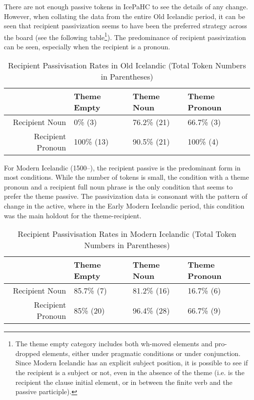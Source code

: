 There are not enough passive tokens in IcePaHC to see the details of any change. However, when collating the data from the entire Old Icelandic period, it can be seen that recipient passivization seems to have been the preferred strategy across the board (see the following table\footnote{The theme empty category includes both wh-moved elements and pro-dropped elements, either under pragmatic conditions or under conjunction. Since Modern Icelandic has an explicit subject position, it is possible to see if the recipient is a subject or not, even in the absence of the theme (i.e. is the recipient the clause initial element, or in between the finite verb and the passive participle).}). The predominance of recipient passivization can be seen, especially when the recipient is a pronoun.

\begin{table}[ht]
\centering
\begin{tabular}{rlll}
  \hline
 & Theme Empty & Theme Noun & Theme Pronoun \\ 
  \hline
Recipient Noun & 0\% (3) & 76.2\% (21) & 66.7\% (3) \\ 
  Recipient Pronoun & 100\% (13) & 90.5\% (21) & 100\% (4) \\ 
   \hline
\end{tabular}
\caption{Recipient Passivisation Rates in Old Icelandic (Total Token Numbers in Parentheses)} 
\end{table}



For Modern Icelandic (1500--), the recipient passive is the predominant form in most conditions. While the number of tokens is small, the condition with a theme pronoun and a recipient full noun phrase is the only condition that seems to prefer the theme passive. The passivization data is consonant with the pattern of change in the active, where in the Early Modern Icelandic period, this condition was the main holdout for the theme-recipient.

\begin{table}[ht]
\centering
\begin{tabular}{rlll}
  \hline
 & Theme Empty & Theme Noun & Theme Pronoun \\ 
  \hline
Recipient Noun & 85.7\% (7) & 81.2\% (16) & 16.7\% (6) \\ 
  Recipient Pronoun & 85\% (20) & 96.4\% (28) & 66.7\% (9) \\ 
   \hline
\end{tabular}
\caption{Recipient Passivisation Rates in Modern Icelandic (Total Token Numbers in Parentheses)} 
\end{table}



